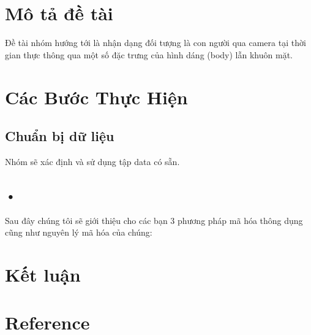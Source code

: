 \documentclass[a4paper]{article}
\begin{document}
\newpage
\tableofcontents
\newpage

\section{Mô tả đề tài}
\hspace{6mm} Đề tài nhóm hướng tới là nhận dạng đối tượng là con người qua camera tại thời gian thực thông qua một số đặc trưng của hình dáng (body) lẫn khuôn mặt.

\section{Các Bước Thực Hiện}
\subsection{Chuẩn bị dữ liệu}
\hspace{6mm} Nhóm sẽ xác định và sử dụng tập data có sẵn.
\subsection{•}
\hspace{6mm}Sau đây chúng tôi sẽ giới thiệu cho các bạn 3 phương pháp mã hóa thông dụng cũng như nguyên lý mã hóa của chúng:

\section{Kết luận }


\section{Reference}


 
\end{document}
